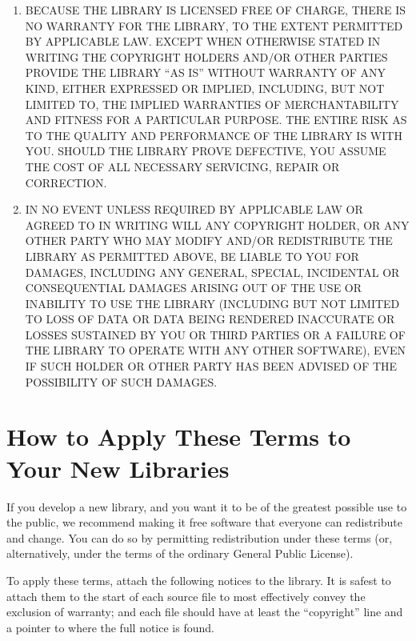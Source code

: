 \begin{enumerate}
\item
BECAUSE THE LIBRARY IS LICENSED FREE OF CHARGE, THERE IS NO
WARRANTY FOR THE LIBRARY, TO THE EXTENT PERMITTED BY APPLICABLE LAW.
EXCEPT WHEN OTHERWISE STATED IN WRITING THE COPYRIGHT HOLDERS AND/OR
OTHER PARTIES PROVIDE THE LIBRARY ``AS IS'' WITHOUT WARRANTY OF ANY
KIND, EITHER EXPRESSED OR IMPLIED, INCLUDING, BUT NOT LIMITED TO, THE
IMPLIED WARRANTIES OF MERCHANTABILITY AND FITNESS FOR A PARTICULAR
PURPOSE.  THE ENTIRE RISK AS TO THE QUALITY AND PERFORMANCE OF THE
LIBRARY IS WITH YOU.  SHOULD THE LIBRARY PROVE DEFECTIVE, YOU ASSUME
THE COST OF ALL NECESSARY SERVICING, REPAIR OR CORRECTION.

\item
IN NO EVENT UNLESS REQUIRED BY APPLICABLE LAW OR AGREED TO IN
WRITING WILL ANY COPYRIGHT HOLDER, OR ANY OTHER PARTY WHO MAY MODIFY
AND/OR REDISTRIBUTE THE LIBRARY AS PERMITTED ABOVE, BE LIABLE TO YOU
FOR DAMAGES, INCLUDING ANY GENERAL, SPECIAL, INCIDENTAL OR
CONSEQUENTIAL DAMAGES ARISING OUT OF THE USE OR INABILITY TO USE THE
LIBRARY (INCLUDING BUT NOT LIMITED TO LOSS OF DATA OR DATA BEING
RENDERED INACCURATE OR LOSSES SUSTAINED BY YOU OR THIRD PARTIES OR A
FAILURE OF THE LIBRARY TO OPERATE WITH ANY OTHER SOFTWARE), EVEN IF
SUCH HOLDER OR OTHER PARTY HAS BEEN ADVISED OF THE POSSIBILITY OF SUCH
DAMAGES.
\end{enumerate}

\section{How to Apply These Terms to Your New Libraries}

  If you develop a new library, and you want it to be of the greatest
possible use to the public, we recommend making it free software that
everyone can redistribute and change.  You can do so by permitting
redistribution under these terms (or, alternatively, under the terms of the
ordinary General Public License).

  To apply these terms, attach the following notices to the library.  It is
safest to attach them to the start of each source file to most effectively
convey the exclusion of warranty; and each file should have at least the
``copyright'' line and a pointer to where the full notice is found.

